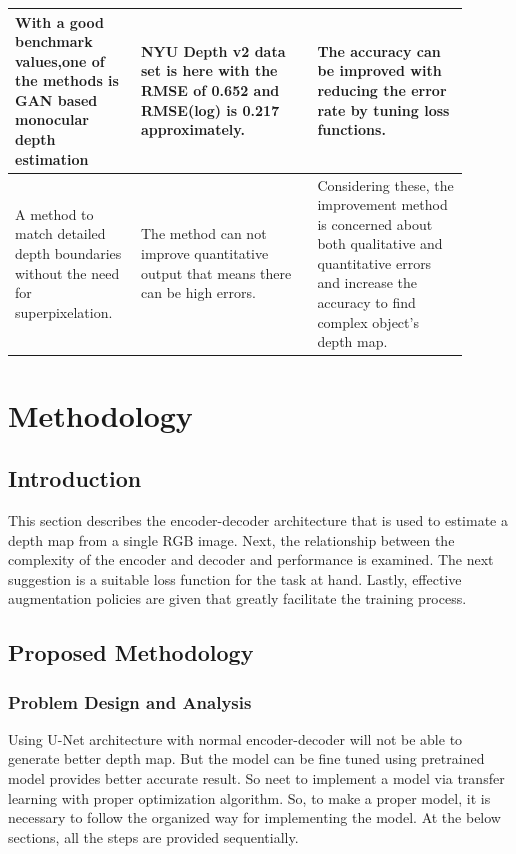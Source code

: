 \documentclass[a4paper,12pt,oneside]{book}
\begin{document}
\begin{table}[!htb]
\begin{threeparttable}
\begin{tabular}{|p{0.25\linewidth}|p{0.35\linewidth}|p{0.30\linewidth}|}
With a good benchmark values,one of the methods is GAN based monocular depth estimation \cite{c6} &
NYU Depth v2 data set is here with the RMSE of 0.652 and RMSE(log) is 0.217 approximately. &
The accuracy can be improved with reducing the error rate by tuning loss functions. \\ 
\hline

A method \cite{c4} to match detailed depth boundaries without the need for superpixelation. &
The method can not improve quantitative output that means there can be high errors. &
Considering these, the improvement method is concerned about both qualitative and quantitative errors and increase the accuracy to find complex object's depth map. \\ \hline
\end{tabular}

\end{threeparttable}
\end{table}




\chapter{\textbf{Methodology}}\label{chap:method}

\section{Introduction}
This section describes the encoder-decoder architecture that is used to estimate a depth map from a single RGB image. Next, the relationship between the complexity of the encoder and decoder and performance is examined. The next suggestion is a suitable loss function for the task at hand. Lastly, effective augmentation policies are given that greatly facilitate the training process.
\section{Proposed Methodology}
\subsection{Problem Design and Analysis}
Using U-Net architecture with normal encoder-decoder will not be able to generate better depth map. But the model can be fine tuned using pretrained model provides better accurate result. So neet to implement a model via transfer learning with proper optimization algorithm. So, to make a proper model, it is necessary to follow the organized way for implementing the model. At the below sections, all the steps are provided sequentially.
\end{document}
